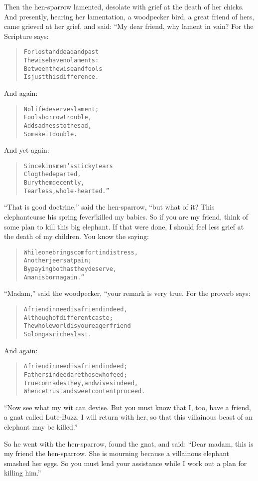 \documentclass[article, twoside, 14pt]{memoir}
\renewenvironment{verbatim}{%
\begin{quote}%
\vskip -10pt%
\begin{alltt}\normalfont\large}{\end{alltt}%
\end{quote}%
\vskip -10pt
} %
\begin{document}
Then the hen-sparrow lamented, desolate with grief at the death of
her chicks. And presently, hearing her lamentation, a woodpecker
bird, a great friend of hers, came grieved at her grief, and said:
“My dear friend, why lament in vain? For the Scripture says:

\begin{verbatim}
For lost and dead and past
    The wise have no laments:
Between the wise and fools
    Is just this difference.
\end{verbatim}
And again:

\begin{verbatim}
No life deserves lament;
    Fools borrow trouble,
Add sadness to the sad,
    So make it double.
\end{verbatim}
And yet again:

\begin{verbatim}
Since kinsmen's sticky tears
    Clog the departed,
Bury them decently,
    Tearless, whole-hearted.”
\end{verbatim}
``That is good doctrine,'' said the hen-sparrow, “but what of it?
This elephant{\textemdash}curse his spring fever!{\textemdash}killed my babies. So if
you are my friend, think of some plan to kill this big elephant. If
that were done, I should feel less grief at the death of my
children. You know the saying:

\begin{verbatim}
While one brings comfort in distress,
    Another jeers at pain;
By paying both as they deserve,
    A man is born again.”
\end{verbatim}
``Madam,'' said the woodpecker, “your remark is very true. For the
proverb says:

\begin{verbatim}
A friend in need is a friend indeed,
    Although of different caste;
The whole world is your eager friend
    So long as riches last.
\end{verbatim}
And again:

\begin{verbatim}
A friend in need is a friend indeed;
Fathers indeed are those who feed;
True comrades they, and wives indeed,
Whence trust and sweet content proceed.
\end{verbatim}
``Now see what my wit can devise. But you must know that I, too, have a friend, a gnat called Lute-Buzz. I will return with her, so that this villainous beast of an elephant may be killed.''

So he went with the hen-sparrow, found the gnat, and said:
``Dear madam, this is my friend the hen-sparrow. She is mourning because a villainous elephant smashed her eggs. So you must lend your assistance while I work out a plan for killing him.''
\end{document}

